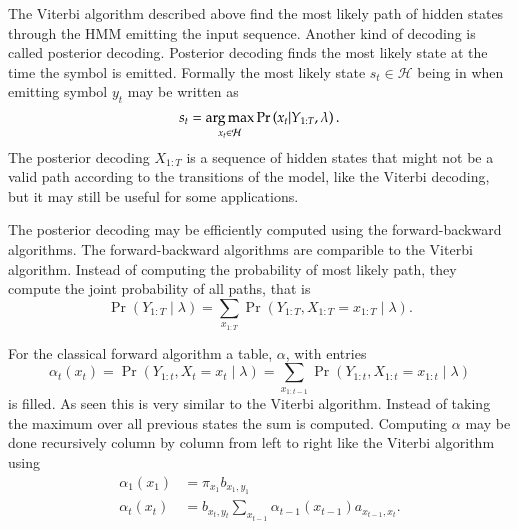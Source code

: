The Viterbi algorithm described above find the most likely path of hidden
states through the HMM emitting the input sequence. Another kind of decoding is
called posterior decoding. Posterior decoding finds the most likely state at
the time the symbol is emitted. Formally the most likely state
$s_t \in \mathcal{H}$ being in when emitting symbol $y_t$ may be written as
\begin{equation*}
  s_t = \operatorname*{arg\,max}_{x_t \in \mathcal{H}} \Pr \left(x_t | Y_{1:T}, \lambda \right).
\end{equation*}
The posterior decoding $X_{1:T}$ is a sequence of hidden states that might not
be a valid path according to the transitions of the model, like the Viterbi
decoding, but it may still be useful for some applications.

The posterior decoding may be efficiently computed using the forward-backward
algorithms. The forward-backward algorithms are comparible to the Viterbi
algorithm. Instead of computing the probability of most likely path, they
compute the joint probability of all paths, that is
\begin{equation*}
  \Pr
  \left(
    Y_{1:T} \mid \lambda
  \right) = \sum_{x_{1:T}} \Pr
  \left(
    Y_{1:T}, X_{1:T} = x_{1:T} \mid \lambda
  \right).
\end{equation*}

For the classical forward algorithm a table, $\alpha$, with entries
\begin{equation*}
\alpha_t(x_t) = \Pr \left( Y_{1:t}, X_t = x_t \mid \lambda \right) =
\sum_{x_{1:t-1}} \Pr \left( Y_{1:t}, X_{1:t} = x_{1:t} \mid \lambda \right)
\end{equation*}
is filled. As seen this is very similar to the Viterbi algorithm. Instead of
taking the maximum over all previous states the sum is computed. Computing
$\alpha$ may be done recursively column by column from left to right like the
Viterbi algorithm using
\begin{equation}
  \label{eq:8}
  \begin{aligned}
    \alpha_1(x_1) &= \pi_{x_1} b_{x_1, y_1} \\
    \alpha_t(x_t) &= b_{x_t, y_t} \sum_{x_{t - 1}} \alpha_{t - 1}(x_{t - 1})
    a_{x_{t - 1}, x_t}.
  \end{aligned}
\end{equation}

